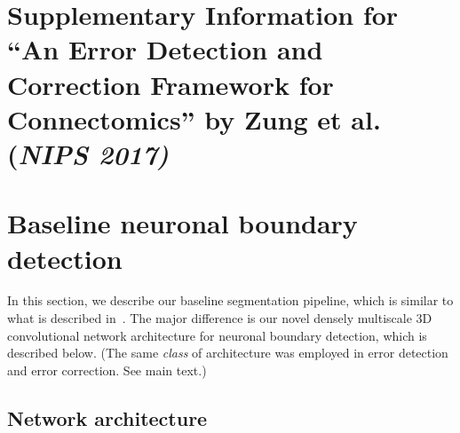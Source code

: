 \documentclass{article}
\begin{document}
\section*{Supplementary Information for ``An Error Detection and Correction Framework for Connectomics'' by Zung et al. (\textsl{NIPS 2017)}}

\appendix
\renewcommand\thefigure{S\arabic{figure}}

\section{Baseline neuronal boundary detection}
\label{appendix:baseline}

In this section, we describe our baseline segmentation pipeline, which is
similar to what is described in~\cite{kisuk}. The major difference is our novel
densely multiscale 3D convolutional network architecture for neuronal boundary
detection, which is described below. (The same \emph{class} of architecture
was employed in error detection and error correction. See main text.)

\subsection{Network architecture}
\label{sec:deltanet}
\end{document}
